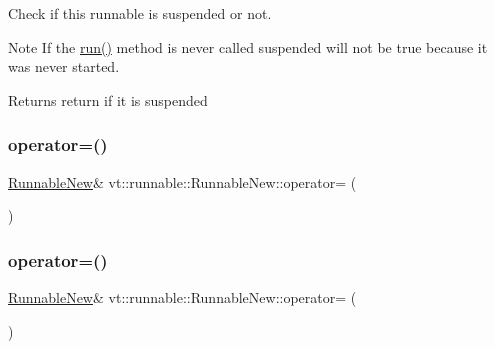 Check if this runnable is suspended or not. 

\begin{DoxyNote}{Note}
If the {\ttfamily \hyperlink{structvt_1_1runnable_1_1_runnable_new_a3fa6c8ee2214c074c748000f782ad793}{run()}} method is never called suspended will not be true because it was never started.
\end{DoxyNote}
\begin{DoxyReturn}{Returns}
return if it is suspended 
\end{DoxyReturn}
\mbox{\label{structvt_1_1runnable_1_1_runnable_new_a12c7ddbd735a9bf704b06ecea7c26e60}} 
\subsubsection{\texorpdfstring{operator=()}{operator=()}\hspace{0.1cm}{\footnotesize\ttfamily [1/2]}}
{\footnotesize\ttfamily \hyperlink{structvt_1_1runnable_1_1_runnable_new}{Runnable\+New}\& vt\+::runnable\+::\+Runnable\+New\+::operator= (\begin{DoxyParamCaption}\item[{\hyperlink{structvt_1_1runnable_1_1_runnable_new}{Runnable\+New} const \&}]{ }\end{DoxyParamCaption})\hspace{0.3cm}{\ttfamily [delete]}}

\mbox{\label{structvt_1_1runnable_1_1_runnable_new_a3561cbcbc3197074cded8da204e98924}} 
\subsubsection{\texorpdfstring{operator=()}{operator=()}\hspace{0.1cm}{\footnotesize\ttfamily [2/2]}}
{\footnotesize\ttfamily \hyperlink{structvt_1_1runnable_1_1_runnable_new}{Runnable\+New}\& vt\+::runnable\+::\+Runnable\+New\+::operator= (\begin{DoxyParamCaption}\item[{\hyperlink{structvt_1_1runnable_1_1_runnable_new}{Runnable\+New} \&\&}]{ }\end{DoxyParamCaption})\hspace{0.3cm}{\ttfamily [default]}}


